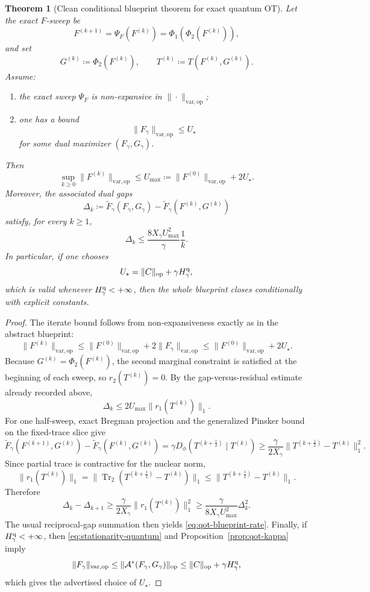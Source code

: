 \documentclass[11pt]{article}
\newcommand{\Trtwo}{\operatorname{Tr}_{2}}
\newcommand{\eqdef}{\coloneqq}
\newcommand{\Aa}{\mathcal{A}}
\newcommand{\Ee}{\widetilde F}
\newcommand{\op}{\mathrm{op}}
\newcommand{\varop}{\mathrm{var},\op}
\theoremstyle{plain}
\newtheorem{theorem}{Theorem}[section]
\begin{document}
\begin{theorem}[Clean conditional blueprint theorem for exact quantum OT]
\label{thm:qot-clean-conditional-blueprint}
Let the exact $F$-sweep be
\[
F^{(k+1)}=\Psi_F(F^{(k)})=\Phi_1(\Phi_2(F^{(k)})),
\]
and set
\[
G^{(k)}\eqdef \Phi_2(F^{(k)}),
\qquad
T^{(k)}\eqdef T(F^{(k)},G^{(k)}).
\]
Assume:
\begin{enumerate}[label=\textnormal{(\arabic*)}]
\item the exact sweep $\Psi_F$ is non-expansive in $\|\cdot\|_{\varop}$;
\item one has a bound
\[
\|F_\gamma\|_{\varop}\le U_\star
\]
for some dual maximizer $(F_\gamma,G_\gamma)$.
\end{enumerate}
Then
\[
\sup_{k\ge 0}\|F^{(k)}\|_{\varop}
\le
U_{\max}
\eqdef
\|F^{(0)}\|_{\varop}+2U_\star.
\]
Moreover, the associated dual gaps
\[
\Delta_k
\eqdef
\Ee_\gamma(F_\gamma,G_\gamma)-\Ee_\gamma(F^{(k)},G^{(k)})
\]
satisfy, for every $k\ge 1$,
\begin{equation}
\label{eq:qot-blueprint-rate}
\Delta_k
\le
\frac{8X_\gamma U_{\max}^2}{\gamma}\frac{1}{k}.
\end{equation}
In particular, if one chooses
\[
U_\star=\|C\|_{\op}+\gamma H_\gamma^{\rm q},
\]
which is valid whenever $H_\gamma^{\rm q}<+\infty$, then the whole blueprint closes conditionally with explicit constants.
\end{theorem}

\begin{proof}
The iterate bound follows from non-expansiveness exactly as in the abstract blueprint:
\[
\|F^{(k)}\|_{\varop}
\le
\|F^{(0)}\|_{\varop}+2\|F_\gamma\|_{\varop}
\le
\|F^{(0)}\|_{\varop}+2U_\star.
\]
Because $G^{(k)}=\Phi_2(F^{(k)})$, the second marginal constraint is satisfied at the beginning of each sweep, so $r_2(T^{(k)})=0$.
By the gap-versus-residual estimate already recorded above,
\[
\Delta_k \le 2U_{\max}\|r_1(T^{(k)})\|_1.
\]
For one half-sweep, exact Bregman projection and the generalized Pinsker bound on the fixed-trace slice give
\[
\Ee_\gamma(F^{(k+1)},G^{(k)})-\Ee_\gamma(F^{(k)},G^{(k)})
=
\gamma D_\phi(T^{(k+\frac12)}\mid T^{(k)})
\ge
\frac{\gamma}{2X_\gamma}\|T^{(k+\frac12)}-T^{(k)}\|_1^2.
\]
Since partial trace is contractive for the nuclear norm,
\[
\|r_1(T^{(k)})\|_1
=
\|\Trtwo(T^{(k+\frac12)}-T^{(k)})\|_1
\le
\|T^{(k+\frac12)}-T^{(k)}\|_1.
\]
Therefore
\[
\Delta_k-\Delta_{k+1}
\ge
\frac{\gamma}{2X_\gamma}\|r_1(T^{(k)})\|_1^2
\ge
\frac{\gamma}{8X_\gamma U_{\max}^2}\Delta_k^2.
\]
The usual reciprocal-gap summation then yields \eqref{eq:qot-blueprint-rate}.
Finally, if $H_\gamma^{\rm q}<+\infty$, then \eqref{eq:stationarity-quantum} and Proposition~\ref{prop:qot-kappa} imply
\[
\|F_\gamma\|_{\varop}
\le
\|\Aa^\ast(F_\gamma,G_\gamma)\|_{\op}
\le
\|C\|_{\op}+\gamma H_\gamma^{\rm q},
\]
which gives the advertised choice of $U_\star$.
\end{proof}
\end{document}
